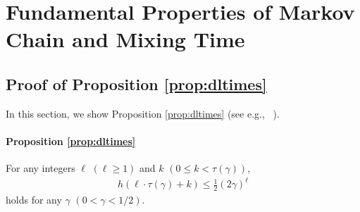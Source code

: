 \documentclass[letter, 11pt]{article}
\newcommand{\1}{\mbox{1}\hspace{-0.25em}\mbox{l}}
\begin{document}
\appendix
\section{Fundamental Properties of Markov Chain and Mixing Time}\label{sec:RMC}
\subsection{Proof of Proposition \ref{prop:dltimes}}
In this section, we show Proposition \ref{prop:dltimes} (see e.g., ~\cite{LPW08, MT06}). 
\paragraph{Proposition \ref{prop:dltimes}}
  For any integers $\ell$  $(\ell\geq 1)$ and 
  $k$ $(0 \leq k < \tau(\gamma))$, 
\begin{eqnarray*}
h \left(\ell \cdotp \tau(\gamma)+k \right)\leq \frac{1}{2}(2\gamma )^\ell
\end{eqnarray*}
 holds for any $\gamma$ $(0<\gamma<1/2)$. 
\end{document}
